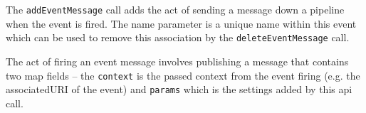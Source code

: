 The \verb+addEventMessage+ call adds the act of sending a message down a pipeline when the event is fired. The name parameter is a unique name within this
event which can be used to remove this association by the \verb+deleteEventMessage+ call.

The act of firing an event message involves publishing a message that contains two map fields --
the \verb+context+ is the passed context from the event firing (e.g. the associatedURI of the event) and
\verb+params+ which is the settings added by this api call.
